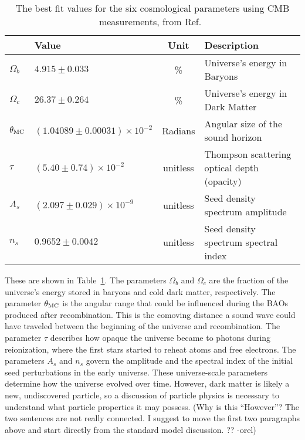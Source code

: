 \begin{table}[b]
  \centering
  \begin{tabular}{llcl}
               & \textbf{Value}                 & \textbf{Unit} & \textbf{Description} \\
    \hline 
    $\Omega_b$ & $ 4.915  \pm0.033                 $ & \%       & Universe's energy in Baryons \\
    $\Omega_c$ & $ 26.37  \pm0.264                 $ & \%       & Universe's energy in Dark Matter \\
    $\theta_{\textrm{MC}}$ & $(1.04089\pm0.00031)\times 10^{-2}$ & Radians  & Angular size of the sound horizon \\
    $\tau$     & $(5.40   \pm0.74   )\times 10^{-2}$ & unitless & Thompson scattering optical depth (opacity)\\
    $A_s$      & $(2.097  \pm0.029  )\times 10^{-9}$ & unitless & Seed density spectrum amplitude \\
    $n_s$      & $ 0.9652 \pm0.0042                $ & unitless & Seed density spectrum spectral index \\
    \hline 
  \end{tabular}
  \caption[6 Cosmological Parameters]{
    The best fit values for the six cosmological parameters using CMB measurements, from Ref.~\cite{planck_dm_limit}}
  \label{tab:six_params}
\end{table}

These are shown in Table~\ref{tab:six_params}.
The parameters $\Omega_b$ and $\Omega_c$ are the fraction of the universe's energy stored in baryons and cold dark matter, respectively.
The parameter $\theta_{\textrm{MC}}$ is the angular range that could be influenced during the BAOs produced after recombination.
This is the comoving distance a sound wave could have traveled between the beginning of the universe and recombination.
The parameter $\tau$ describes how opaque the universe became to photons during reionization, where the first stars started to reheat atoms and free electrons.
The parameters $A_s$ and $n_s$ govern the amplitude and the spectral index of the initial seed perturbations in the early universe.
These universe-scale parameters determine how the universe evolved over time.
However, dark matter is likely a new, undiscovered particle,  so a discussion of particle physics is necessary to understand what particle properties it may possess.
{\color{red}(Why is this ``However''? The two sentences are not really connected.  I suggest to move the first two paragraphs above and start directly from the standard model discussion. ?? -orel)}


